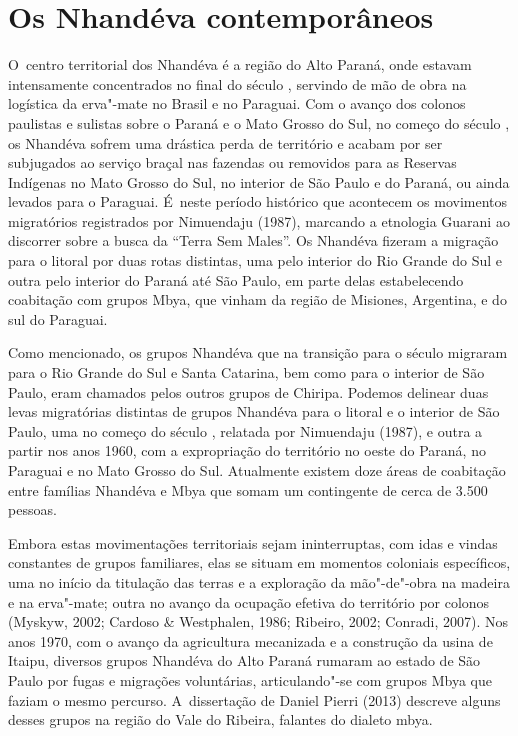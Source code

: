 \section{Os Nhandéva contemporâneos}

O~centro territorial dos Nhandéva é a região do Alto Paraná, onde
estavam intensamente concentrados no final do século , servindo de
mão de obra na logística da erva"-mate no Brasil e no Paraguai. Com o
avanço dos colonos paulistas e sulistas sobre o Paraná e o Mato Grosso
do Sul, no começo do século , os Nhandéva sofrem uma drástica perda
de território e acabam por ser subjugados ao serviço braçal nas
fazendas ou removidos para as Reservas Indígenas no Mato Grosso do Sul,
no interior de São Paulo e do Paraná, ou ainda levados para o Paraguai.
É~neste período histórico que acontecem os movimentos migratórios
registrados por Nimuendaju (1987), marcando a etnologia Guarani ao
discorrer sobre a busca da ``Terra Sem Males''. Os Nhandéva fizeram a
migração para o litoral por duas rotas distintas, uma pelo interior do
Rio Grande do Sul e outra pelo interior do Paraná até São Paulo, em
parte delas estabelecendo coabitação com grupos Mbya, que vinham da
região de Misiones, Argentina, e do sul do Paraguai.

Como mencionado, os grupos Nhandéva que na transição para o século 
migraram para o Rio Grande do Sul e Santa Catarina, bem como para o
interior de São Paulo, eram chamados pelos outros grupos de Chiripa.
Podemos delinear duas levas migratórias distintas de grupos Nhandéva
para o litoral e o interior de São Paulo, uma no começo do século ,
relatada por Nimuendaju (1987), e outra a partir nos anos 1960, com a
expropriação do território no oeste do Paraná, no Paraguai e no Mato
Grosso do Sul. Atualmente existem doze áreas de coabitação entre
famílias Nhandéva e Mbya que somam um contingente de cerca de 3.500
pessoas.

Embora estas movimentações territoriais sejam ininterruptas, com idas e
vindas constantes de grupos familiares, elas se situam em momentos
coloniais específicos, uma no início da titulação das terras e a
exploração da mão"-de"-obra na madeira e na erva"-mate; outra no avanço da
ocupação efetiva do território por colonos (Myskyw, 2002; Cardoso \&
Westphalen, 1986; Ribeiro, 2002; Conradi, 2007). Nos anos 1970, com o
avanço da agricultura mecanizada e a construção da usina de Itaipu,
diversos grupos Nhandéva do Alto Paraná rumaram ao estado de São Paulo
por fugas e migrações voluntárias, articulando"-se com grupos Mbya que
faziam o mesmo percurso. A~dissertação de Daniel Pierri (2013) descreve
alguns desses grupos na região do Vale do Ribeira, falantes do dialeto
mbya.

